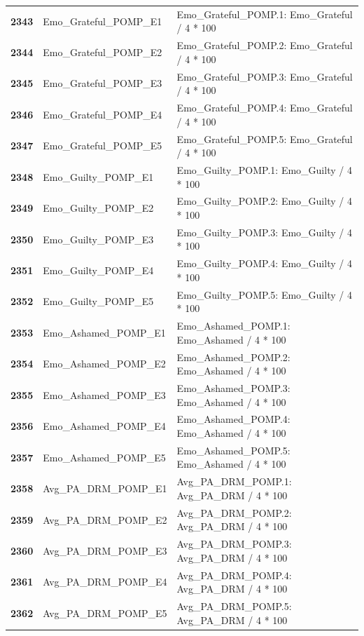\documentclass[
  letterpaper,
  DIV=11,
  numbers=noendperiod]{scrartcl}
\begin{document}
\begin{longtable}[t]{>{}cll}
\textbf{2343} & Emo\_Grateful\_POMP\_E1 & Emo\_Grateful\_POMP.1: Emo\_Grateful / 4 * 100\\
\textbf{2344} & Emo\_Grateful\_POMP\_E2 & Emo\_Grateful\_POMP.2: Emo\_Grateful / 4 * 100\\
\textbf{2345} & Emo\_Grateful\_POMP\_E3 & Emo\_Grateful\_POMP.3: Emo\_Grateful / 4 * 100\\
\addlinespace
\textbf{2346} & Emo\_Grateful\_POMP\_E4 & Emo\_Grateful\_POMP.4: Emo\_Grateful / 4 * 100\\
\textbf{2347} & Emo\_Grateful\_POMP\_E5 & Emo\_Grateful\_POMP.5: Emo\_Grateful / 4 * 100\\
\textbf{2348} & Emo\_Guilty\_POMP\_E1 & Emo\_Guilty\_POMP.1: Emo\_Guilty / 4 * 100\\
\textbf{2349} & Emo\_Guilty\_POMP\_E2 & Emo\_Guilty\_POMP.2: Emo\_Guilty / 4 * 100\\
\textbf{2350} & Emo\_Guilty\_POMP\_E3 & Emo\_Guilty\_POMP.3: Emo\_Guilty / 4 * 100\\
\addlinespace
\textbf{2351} & Emo\_Guilty\_POMP\_E4 & Emo\_Guilty\_POMP.4: Emo\_Guilty / 4 * 100\\
\textbf{2352} & Emo\_Guilty\_POMP\_E5 & Emo\_Guilty\_POMP.5: Emo\_Guilty / 4 * 100\\
\textbf{2353} & Emo\_Ashamed\_POMP\_E1 & Emo\_Ashamed\_POMP.1: Emo\_Ashamed / 4 * 100\\
\textbf{2354} & Emo\_Ashamed\_POMP\_E2 & Emo\_Ashamed\_POMP.2: Emo\_Ashamed / 4 * 100\\
\textbf{2355} & Emo\_Ashamed\_POMP\_E3 & Emo\_Ashamed\_POMP.3: Emo\_Ashamed / 4 * 100\\
\addlinespace
\textbf{2356} & Emo\_Ashamed\_POMP\_E4 & Emo\_Ashamed\_POMP.4: Emo\_Ashamed / 4 * 100\\
\textbf{2357} & Emo\_Ashamed\_POMP\_E5 & Emo\_Ashamed\_POMP.5: Emo\_Ashamed / 4 * 100\\
\textbf{2358} & Avg\_PA\_DRM\_POMP\_E1 & Avg\_PA\_DRM\_POMP.1: Avg\_PA\_DRM / 4 * 100\\
\textbf{2359} & Avg\_PA\_DRM\_POMP\_E2 & Avg\_PA\_DRM\_POMP.2: Avg\_PA\_DRM / 4 * 100\\
\textbf{2360} & Avg\_PA\_DRM\_POMP\_E3 & Avg\_PA\_DRM\_POMP.3: Avg\_PA\_DRM / 4 * 100\\
\addlinespace
\textbf{2361} & Avg\_PA\_DRM\_POMP\_E4 & Avg\_PA\_DRM\_POMP.4: Avg\_PA\_DRM / 4 * 100\\
\textbf{2362} & Avg\_PA\_DRM\_POMP\_E5 & Avg\_PA\_DRM\_POMP.5: Avg\_PA\_DRM / 4 * 100\\

\end{longtable}
\end{document}
